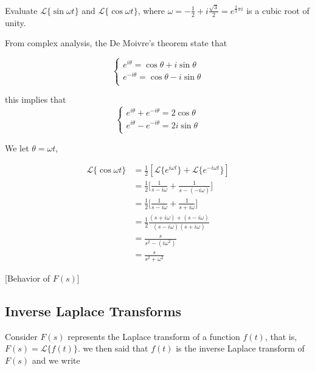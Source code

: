 \begin{example}
    Evaluate $\mathcal{L}\{\sin \omega t \}$ and $\mathcal{L}\{\cos \omega t \}$, where 
    $\omega = -\frac{1}{2}+i\frac{\sqrt{3}}{2} = e^{\frac{2}{3}\pi i}$ is a cubic root of unity.
\end{example}
\begin{solution}
    From complex analysis, the De Moivre's theorem state that 

    \[
        \begin{cases}
            e^{i\theta} = \cos \theta + i \sin \theta\\
            e^{-i\theta} = \cos \theta - i \sin \theta\\
        \end{cases}
    \]

    this implies that 
    \[
    \begin{cases}
        e^{i\theta} + e^{-i\theta} = 2\cos \theta\\
        e^{i\theta} - e^{-i\theta} = 2i \sin \theta\\
    \end{cases}
    \]

    We let $\theta = \omega t$, 

    \begin{align*}
        \mathcal{L} \{ \cos \omega t \} &= \frac{1}{2} [ \mathcal{L} \{e^{i\omega t}\} + \mathcal{L} \{e^{-i\omega t}\} ]\\
        &= \frac{1}{2} \biggl[\frac{1}{s - i\omega} + \frac{1}{s - (-i\omega)}\biggr]\\
        &= \frac{1}{2} \biggl[\frac{1}{s - i\omega} + \frac{1}{s + i\omega}\biggr]\\
        &= \frac{1}{2} \frac{(s + i\omega) + (s - i\omega)}{(s - i\omega)(s + i\omega)}\\
        &= \frac{s}{s^2 - (i\omega^2)}\\
        &= \frac{s}{s^2 + \omega^2}
    \end{align*}

\end{solution}[Behavior of $F(s)$]
    
\subsection{Inverse Laplace Transforms}  
Consider $F(s)$ represents the Laplace transform of a function $f(t)$, that is, $F(s) = \mathcal{L}\{f(t) \}$.
we then said that $f(t)$ is the inverse Laplace transform of $F(s)$ and we write

